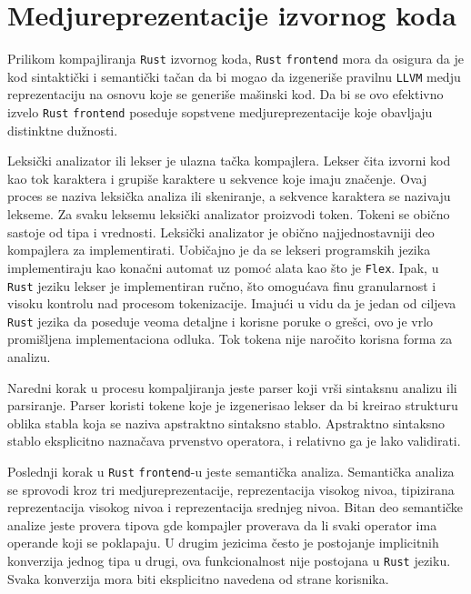 \section{Medjureprezentacije izvornog koda}

Prilikom kompajliranja \verb|Rust| izvornog koda, \verb|Rust| \verb|frontend| mora da osigura da je 
kod sintaktički i semantički tačan da bi mogao da izgeneriše pravilnu \verb|LLVM| medju reprezentaciju 
na osnovu koje se generiše mašinski kod. Da bi se ovo efektivno izvelo \verb|Rust| \verb|frontend| poseduje 
sopstvene medjureprezentacije koje obavljaju distinktne dužnosti. 

Leksički analizator ili lekser je ulazna tačka kompajlera. Lekser čita izvorni kod kao tok karaktera i grupiše karaktere 
u sekvence koje imaju značenje. Ovaj proces se naziva leksička analiza ili skeniranje, a sekvence karaktera se nazivaju lekseme. 
Za svaku leksemu leksički analizator proizvodi token. Tokeni se obično sastoje od tipa i vrednosti.
Leksički analizator je obično najjednostavniji deo kompajlera za implementirati. 
Uobičajno je da se lekseri programskih jezika implementiraju kao konačni automat uz pomoć alata kao što 
je \verb|Flex|. Ipak, u \verb|Rust| jeziku lekser je implementiran ručno, što omogućava finu granularnost 
i visoku kontrolu nad procesom tokenizacije. Imajući u vidu da je jedan od ciljeva \verb|Rust| jezika 
da poseduje veoma detaljne i korisne poruke o grešci, ovo je vrlo promišljena implementaciona odluka. 
Tok tokena nije naročito korisna forma za analizu.

Naredni korak u procesu kompaljiranja jeste parser koji vrši sintaksnu analizu ili parsiranje. 
Parser koristi tokene koje je izgenerisao lekser da bi kreirao strukturu oblika stabla koja se naziva 
apstraktno sintaksno stablo. Apstraktno sintaksno stablo eksplicitno naznačava prvenstvo operatora,
i relativno ga je lako validirati.

Poslednji korak u \verb|Rust| \verb|frontend|-u jeste semantička analiza. Semantička analiza se sprovodi 
kroz tri medjureprezentacije, reprezentacija visokog nivoa, tipizirana reprezentacija visokog nivoa
i reprezentacija srednjeg nivoa. Bitan deo semantičke analize jeste provera tipova gde kompajler proverava 
da li svaki operator ima operande koji se poklapaju. U drugim jezicima često je postojanje implicitnih 
konverzija jednog tipa u drugi, ova funkcionalnost nije postojana u \verb|Rust| jeziku. Svaka konverzija 
mora biti eksplicitno navedena od strane korisnika.

